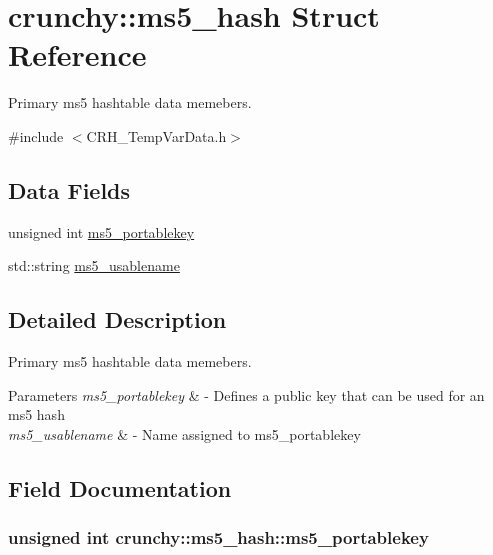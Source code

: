 \hypertarget{structcrunchy_1_1ms5__hash}{}\section{crunchy\+:\+:ms5\+\_\+hash Struct Reference}
\label{structcrunchy_1_1ms5__hash}


Primary ms5 hashtable data memebers.  




{\ttfamily \#include $<$C\+R\+H\+\_\+\+Temp\+Var\+Data.\+h$>$}

\subsection*{Data Fields}
\begin{DoxyCompactItemize}
\item 
unsigned int \hyperlink{structcrunchy_1_1ms5__hash_ac9cfaf8430a5d1da38684a28314b11e2}{ms5\+\_\+portablekey}
\item 
std\+::string \hyperlink{structcrunchy_1_1ms5__hash_a375a1251bbe67bb9928f1b4154154ef0}{ms5\+\_\+usablename}
\end{DoxyCompactItemize}


\subsection{Detailed Description}
Primary ms5 hashtable data memebers. 


\begin{DoxyParams}{Parameters}
{\em ms5\+\_\+portablekey} & -\/ Defines a public key that can be used for an ms5 hash \\
\hline
{\em ms5\+\_\+usablename} & -\/ Name assigned to ms5\+\_\+portablekey \\
\hline
\end{DoxyParams}


\subsection{Field Documentation}
\hypertarget{structcrunchy_1_1ms5__hash_ac9cfaf8430a5d1da38684a28314b11e2}{}
\subsubsection[{ms5\+\_\+portablekey}]{\setlength{\rightskip}{0pt plus 5cm}unsigned int crunchy\+::ms5\+\_\+hash\+::ms5\+\_\+portablekey}\label{structcrunchy_1_1ms5__hash_ac9cfaf8430a5d1da38684a28314b11e2}
\hypertarget{structcrunchy_1_1ms5__hash_a375a1251bbe67bb9928f1b4154154ef0}{}
